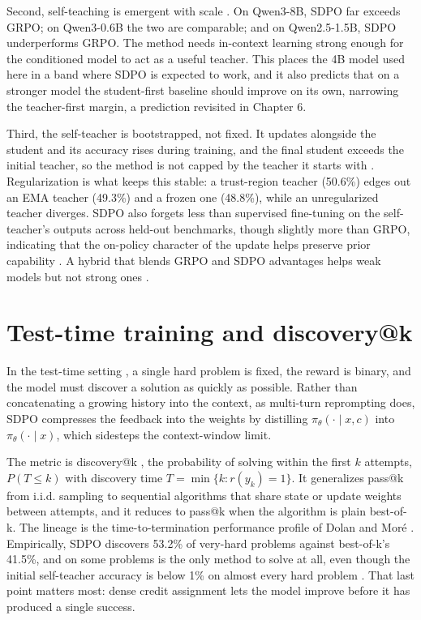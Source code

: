 Second, self-teaching is emergent with scale \cite{r1}. On Qwen3-8B, SDPO far exceeds GRPO; on Qwen3-0.6B the two are comparable; and on Qwen2.5-1.5B, SDPO underperforms GRPO. The method needs in-context learning strong enough for the conditioned model to act as a useful teacher. This places the 4B model used here in a band where SDPO is expected to work, and it also predicts that on a stronger model the student-first baseline should improve on its own, narrowing the teacher-first margin, a prediction revisited in Chapter 6.

Third, the self-teacher is bootstrapped, not fixed. It updates alongside the student and its accuracy rises during training, and the final student exceeds the initial teacher, so the method is not capped by the teacher it starts with \cite{r1}. Regularization is what keeps this stable: a trust-region teacher (50.6\%) edges out an EMA teacher (49.3\%) and a frozen one (48.8\%), while an unregularized teacher diverges. SDPO also forgets less than supervised fine-tuning on the self-teacher's outputs across held-out benchmarks, though slightly more than GRPO, indicating that the on-policy character of the update helps preserve prior capability \cite{r1}. A hybrid that blends GRPO and SDPO advantages helps weak models but not strong ones \cite{r1}.

\section{Test-time training and discovery@k}\label{test-time-training-and-discoveryk}

In the test-time setting \cite{r1}, a single hard problem is fixed, the reward is binary, and the model must discover a solution as quickly as possible. Rather than concatenating a growing history into the context, as multi-turn reprompting does, SDPO compresses the feedback into the weights by distilling \(\pi_\theta(\cdot \mid x, c)\) into \(\pi_\theta(\cdot \mid x)\), which sidesteps the context-window limit.

The metric is discovery@k \cite{r1}, the probability of solving within the first \(k\) attempts, \(P(T \le k)\) with discovery time \(T = \min\{k : r(y_k) = 1\}\). It generalizes pass@k \cite{r9} from i.i.d. sampling to sequential algorithms that share state or update weights between attempts, and it reduces to pass@k when the algorithm is plain best-of-k. The lineage is the time-to-termination performance profile of Dolan and Moré \cite{r12}. Empirically, SDPO discovers 53.2\% of very-hard problems against best-of-k's 41.5\%, and on some problems is the only method to solve at all, even though the initial self-teacher accuracy is below 1\% on almost every hard problem \cite{r1}. That last point matters most: dense credit assignment lets the model improve before it has produced a single success.

